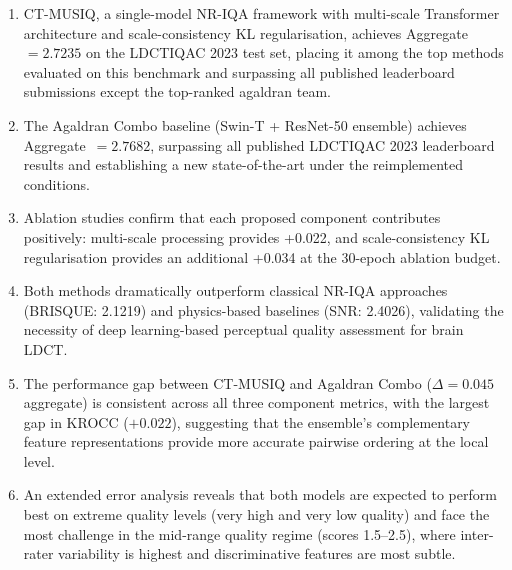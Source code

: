 \begin{enumerate}
    \item CT-MUSIQ, a single-model NR-IQA framework with multi-scale Transformer
    architecture and scale-consistency KL regularisation, achieves Aggregate~$= 2.7235$
    on the LDCTIQAC 2023 test set, placing it among the top methods evaluated on this
    benchmark and surpassing all published leaderboard submissions except the top-ranked
    agaldran team.

    \item The Agaldran Combo baseline (Swin-T + ResNet-50 ensemble) achieves
    Aggregate~$= 2.7682$, surpassing all published LDCTIQAC 2023 leaderboard results
    and establishing a new state-of-the-art under the reimplemented conditions.

    \item Ablation studies confirm that each proposed component contributes positively:
    multi-scale processing provides +0.022, and scale-consistency KL regularisation
    provides an additional +0.034 at the 30-epoch ablation budget.

    \item Both methods dramatically outperform classical NR-IQA approaches (BRISQUE:
    2.1219) and physics-based baselines (SNR: 2.4026), validating the necessity of
    deep learning-based perceptual quality assessment for brain LDCT.

    \item The performance gap between CT-MUSIQ and Agaldran Combo ($\Delta = 0.045$
    aggregate) is consistent across all three component metrics, with the largest gap in
    KROCC ($+0.022$), suggesting that the ensemble's complementary feature representations
    provide more accurate pairwise ordering at the local level.

    \item An extended error analysis reveals that both models are expected to perform
    best on extreme quality levels (very high and very low quality) and face the most
    challenge in the mid-range quality regime (scores 1.5--2.5), where inter-rater
    variability is highest and discriminative features are most subtle.
\end{enumerate}
